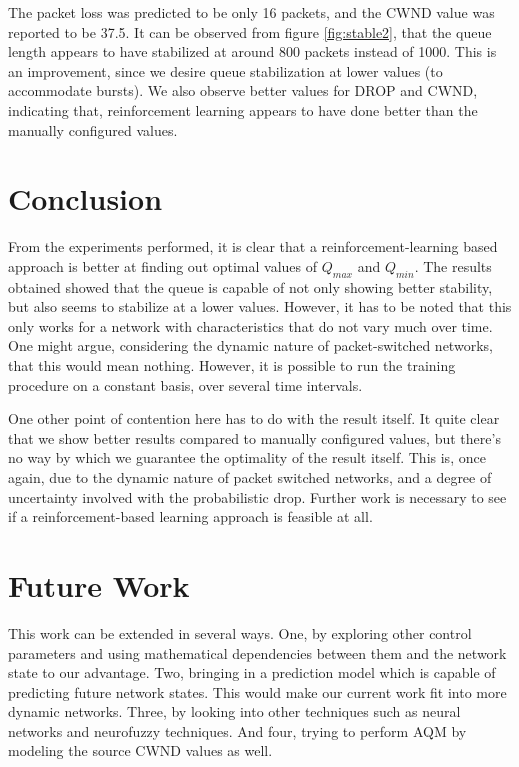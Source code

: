 \documentclass[conference, 10pt]{IEEEtran}
\begin{document}
The packet loss was predicted to be only 16 packets, and the CWND value was reported to be 37.5. It can be observed from figure \ref{fig:stable2}, that the queue length appears to have stabilized at around 800 packets instead of 1000. This is an improvement, since we desire queue stabilization at lower values (to accommodate bursts). We also observe better values for DROP and CWND, indicating that, reinforcement learning appears to have done better than the manually configured values.

\section{Conclusion}
From the experiments performed, it is clear that a reinforcement-learning based approach is better at finding out optimal values of $Q_{max}$ and $Q_{min}$. The results obtained showed that the queue is capable of not only showing better stability, but also seems to stabilize at a lower values. However, it has to be noted that this only works for a network with characteristics that do not vary much over time. One might argue, considering the dynamic nature of packet-switched networks, that this would mean nothing. However, it is possible to run the training procedure on a constant basis, over several time intervals. 

One other point of contention here has to do with the result itself. It quite clear that we show better results compared to manually configured values, but there's no way by which we guarantee the optimality of the result itself. This is, once again, due to the dynamic nature of packet switched networks, and a degree of uncertainty involved with the probabilistic drop. Further work is necessary to see if a reinforcement-based learning approach is feasible at all.
\label{sec:conc}


\section{Future Work}
\label{sec:future}
This work can be extended in several ways. One, by exploring other control parameters and using mathematical dependencies between them and the network state to our advantage. Two, bringing in a prediction model which is capable of predicting future network states. This would make our current work fit into more dynamic networks. Three, by looking into other techniques such as neural networks and neurofuzzy techniques. And four, trying to perform AQM by modeling the source CWND values as well. 


\end{document}
